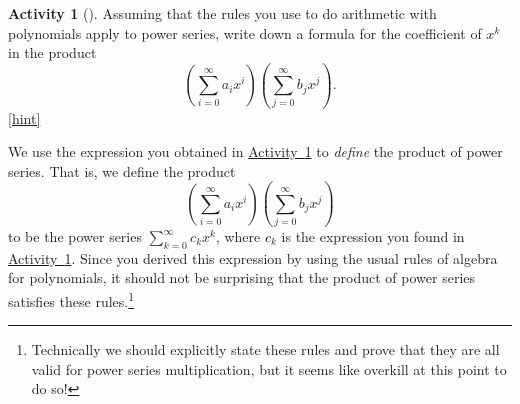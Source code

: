 \documentclass[10pt,]{book}
\theoremstyle{plain}
\theoremstyle{definition}
\theoremstyle{definition}
\theoremstyle{definition}
\newtheorem{activity}[project]{Activity}
\numberwithin{equation}{chapter}
\begin{document}
\begin{activity}[]\label{coeffinpowerseries}
\hypertarget{p-1293}{}%
Assuming that the rules you use to do arithmetic with polynomials apply to power series, write down a formula for the coefficient of \(x^k\) in the product%
\begin{equation*}
\left(\sum_{i=0}^\infty a_ix^i\right)\left(\sum_{j=0}^\infty
b_jx^j\right)\text{.}
\end{equation*}
%
\hfill{\tiny\hyperlink{a-248}{[hint]}\hypertarget{q-248}{}}\end{activity}
\hypertarget{p-1296}{}%
We use the expression you obtained in \hyperref[coeffinpowerseries]{Activity~\ref{coeffinpowerseries}} to \emph{define} the product of power series. That is, we define the product%
\begin{equation*}
\left(\sum_{i=0}^\infty a_ix^i\right)\left(\sum_{j=0}^\infty
b_jx^j\right)
\end{equation*}
to be the power series \(\sum_{k=0}^\infty c_k x^k\), where \(c_k\) is the expression you found in \hyperref[coeffinpowerseries]{Activity~\ref{coeffinpowerseries}}. Since you derived this expression by using the usual rules of algebra for polynomials, it should not be surprising that the product of power series satisfies these rules.\footnote{Technically we should explicitly state these rules and prove that they are all valid for power series multiplication, but it seems like overkill at this point to do so!\label{fn-16}}%
\typeout{************************************************}
\typeout{************************************************}
\end{document}
